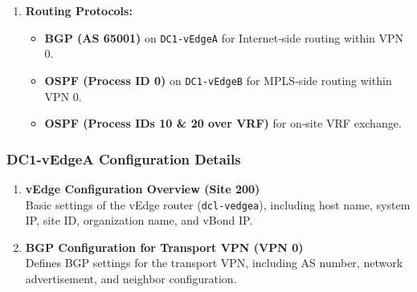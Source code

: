 \documentclass[12pt,english]{report}
\begin{document}
\begin{enumerate}
    \item \textbf{Routing Protocols:}
    \begin{itemize}
        \item \textbf{BGP (AS 65001)} on \texttt{DC1‑vEdgeA} for Internet‑side routing within VPN 0.
        \item \textbf{OSPF (Process ID 0)} on \texttt{DC1‑vEdgeB} for MPLS‑side routing within VPN 0.
        \item \textbf{OSPF (Process IDs 10 \& 20 over VRF)} for on‑site VRF exchange.
    \end{itemize}
\end{enumerate}
\subsubsection{DC1-vEdgeA Configuration Details}
\begin{enumerate}
    \item \textbf{vEdge Configuration Overview (Site 200)} \\
    Basic settings of the vEdge router (\texttt{dcl-vedgea}), including host name, system IP, site ID, organization name, and vBond IP.

    \item \textbf{BGP Configuration for Transport VPN (VPN 0)} \\
    Defines BGP settings for the transport VPN, including AS number, network advertisement, and neighbor configuration.
\end{enumerate}
\end{document}
